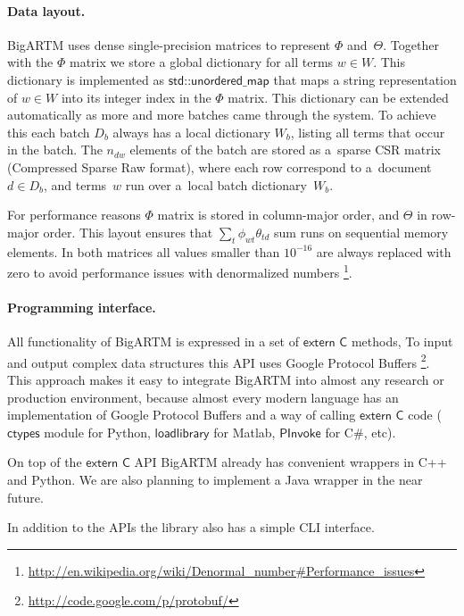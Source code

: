 \documentclass[russian]{llncs}
\newcommand{\kw}[1]{\textsf{#1}}
\begin{document}
\paragraph{Data layout.}
BigARTM uses dense single-precision matrices to represent $\Phi$ and~$\Theta$.
Together with the $\Phi$ matrix we store a global dictionary for all terms ${w \in W}$.
This dictionary is implemented as $\kw{std::unordered\_map}$ that maps a string representation of ${w \in W}$
into its integer index in the $\Phi$ matrix.
This dictionary can be extended automatically as more and more batches came through the system.
To achieve this each batch $D_b$ always has a local dictionary $W_b$, listing all terms that occur in the batch.
The $n_{dw}$ elements of the batch are stored as a~sparse CSR matrix (Compressed Sparse Raw format),
where each row correspond to a~document ${d \in D_b}$, 
and terms~$w$ run over a~local batch dictionary~$W_b$.

For performance reasons $\Phi$ matrix is stored in column-major order, and $\Theta$ in row-major order.
This layout ensures that $\sum_t \phi_{wt} \theta_{td}$ sum runs on sequential memory elements.
In both matrices all values smaller than $10^{-16}$ are always replaced with zero to avoid performance issues with denormalized numbers%
\footnote{\url{http://en.wikipedia.org/wiki/Denormal_number#Performance_issues}}.

\paragraph{Programming interface.}
All functionality of BigARTM is expressed in a set of $\kw{extern C}$ methods,
To input and output complex data structures this API uses Google Protocol Buffers%
\footnote{\url{http://code.google.com/p/protobuf/}}.
This approach makes it easy to integrate BigARTM into almost any research or production environment,
because almost every modern language has an implementation of Google Protocol Buffers
and a way of calling $\kw{extern C}$ code
($\kw{ctypes}$ module for Python, $\kw{loadlibrary}$ for Matlab, $\kw{PInvoke}$ for C\#, etc).

On top of the $\kw{extern C}$ API BigARTM already has convenient wrappers in C++ and Python.
We are also planning to implement a Java wrapper in the near future.

In addition to the APIs the library also has a simple CLI interface.
\end{document}

